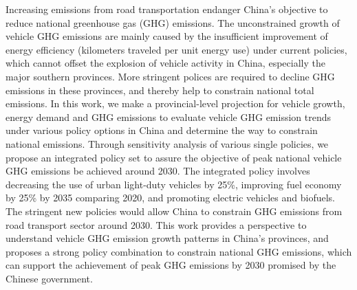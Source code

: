 Increasing emissions from road transportation endanger China’s objective to reduce national greenhouse gas (GHG) emissions. The unconstrained growth of vehicle GHG emissions are mainly caused by the insufficient improvement of energy efficiency (kilometers traveled per unit energy use) under current policies, which cannot offset the explosion of vehicle activity in China, especially the major southern provinces. More stringent polices are required to decline GHG emissions in these provinces, and thereby help to constrain national total emissions. In this work, we make a provincial-level projection for vehicle growth, energy demand and GHG emissions to evaluate vehicle GHG emission trends under various policy options in China and determine the way to constrain national emissions. Through sensitivity analysis of various single policies, we propose an integrated policy set to assure the objective of peak national vehicle GHG emissions be achieved around 2030. The integrated policy involves decreasing the use of urban light-duty vehicles by 25\%, improving fuel economy by 25\% by 2035 comparing 2020, and promoting electric vehicles and biofuels. The stringent new policies would allow China to constrain GHG emissions from road transport sector around 2030. This work provides a perspective to understand vehicle GHG emission growth patterns in China’s provinces, and proposes a strong policy combination to constrain national GHG emissions, which can support the achievement of peak GHG emissions by 2030 promised by the Chinese government.
